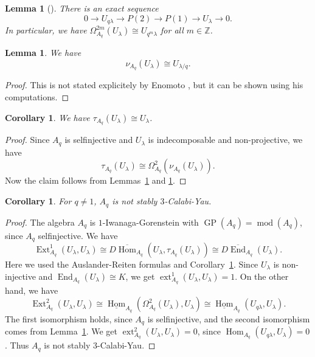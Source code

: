 \documentclass[12pt,reqno]{amsart}
\newtheorem{Lem}[Thm]{Lemma}
\newtheorem{Cor}[Thm]{Corollary}
\theoremstyle{definition}
\newcommand{\Z}{\mathbb{Z}}
\newcommand{\md}{\operatorname{mod}}
\newcommand{\GP}{\operatorname{GP}}
\newcommand{\Hom}{\operatorname{Hom}}
\newcommand{\Ext}{\operatorname{Ext}}
\newcommand{\ext}{\operatorname{ext}}
\newcommand{\End}{\operatorname{End}}
\begin{document}
\begin{Lem}[{\cite[Propositions~4.1]{E26}}]
\label{lem:eno2}
There is an exact sequence
$$
0 \to U_{q\lambda} \to P(2) \to P(1) \to U_\lambda \to 0.
$$
In particular, we have
$\Omega_{A_q}^{2m}(U_\lambda) \cong U_{q^m\lambda}$
for all $m \in \Z$.
\end{Lem}

\begin{Lem}\label{lem:eno3}
We have
$$
\nu_{A_q}(U_\lambda) \cong U_{\lambda/q}.
$$
\end{Lem}

\begin{proof}
This is not stated explicitely by Enomoto \cite{E26}, but it can be shown using his computations.
\end{proof}

\begin{Cor}\label{cor:eno5}
We have $\tau_{A_q}(U_\lambda) \cong U_\lambda$.
\end{Cor}

\begin{proof}
Since $A_q$ is selfinjective and $U_\lambda$ is indecomposable and non-projective, we have 
$$
\tau_{A_q}(U_\lambda) \cong \Omega_{A_q}^2(\nu_{A_q}(U_\lambda)).
$$
Now the claim follows from Lemmas~\ref{lem:eno2} and \ref{lem:eno3}.
\end{proof}

\begin{Cor}\label{cor:eno4}
For $q \not= 1$, $A_q$ is not stably
$3$-Calabi-Yau. 
\end{Cor}

\begin{proof}
The algebra $A_q$ is $1$-Iwanaga-Gorenstein
with $\GP(A_q) = \md(A_q)$, since
$A_q$ selfinjective.
We have 
$$
\Ext_{A_q}^1(U_\lambda,U_\lambda) \cong 
D\overline{\Hom}_{A_q}(U_\lambda,\tau_{A_q}(U_\lambda))
\cong D\overline{\End}_{A_q}(U_\lambda).
$$
Here we used the Auslander-Reiten formulas and Corollary~\ref{cor:eno5}.
Since $U_\lambda$ is non-injective and $\End_{A_q}(U_\lambda) \cong K$, we
get $\ext_{A_q}^1(U_\lambda,U_\lambda) = 1$.
On the other hand, we have
$$
\Ext_{A_q}^2(U_\lambda,U_{\lambda}) \cong
\underline{\Hom}_{A_q}(\Omega_{A_q}^2(U_\lambda),U_{\lambda}) 
\cong 
\underline{\Hom}_{A_q}(U_{q\lambda},U_{\lambda}).
$$
The first isomorphism holds, since $A_q$ is selfinjective, and the second isomorphism
comes from Lemma~\ref{lem:eno2}.
We get $\ext_{A_q}^2(U_\lambda,U_\lambda) = 0$, since
$\Hom_{A_q}(U_{q\lambda},U_\lambda) = 0$.
Thus $A_q$ is not stably $3$-Calabi-Yau.
\end{proof}
\end{document}
